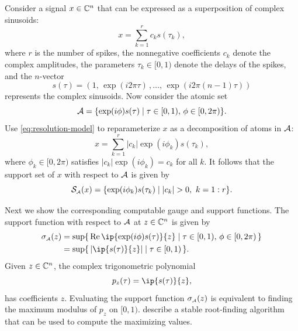 \begin{example}
  Consider a signal $x \in \mathbb{C}^n$ that can be expressed as a superposition
  of complex sinusoids:
  \begin{equation} \label{eq:resolution-model}
    x = \sum_{k = 1}^r c_ks(\tau_k),
  \end{equation}
  where $r$ is the number of spikes, the nonnegative coefficients $c_k$ denote
  the complex amplitudes, the parameters $\tau_k \in [0, 1)$ denote the delays
  of the spikes, and the $n$-vector
  \[
    s(\tau) = (1,\, \exp(i2\pi\tau)\,, \dots,\, \exp(i2\pi(n-1)\tau))
  \]
  represents the complex sinusoids. Now consider the atomic set
  \[
    \mathcal{A} = \{\exp(i\phi)s(\tau) \mid \tau\in[0,1),\, \phi\in[0, 2\pi)\}.
  \]
  Use \eqref{eq:resolution-model} to reparameterize $x$ as a decomposition of
  atoms in $\mathcal{A}$:
  \[
    x = \sum_{k = 1}^r |c_k|\exp(i\phi_k)s(\tau_k),
  \]
  where $\phi_k \in[0, 2\pi)$ satisfies $|c_k|\exp(i\phi_k) = c_k$ for all $k$.
  It follows that the support set of $x$ with respect to $\mathcal{A}$ is given by
  \[
    \mathcal{S}_{\scriptscriptstyle\mathcal{A}}(x) = \{\exp(i\phi_k)s(\tau_k) \mid |c_k| > 0,\ k=1:r\}.
  \]

  Next we show the corresponding computable gauge and support functions. The
  support function with respect to $\mathcal{A}$ at $z \in \mathbb{C}^n$ is given by
  \begin{align*}
    \sigma\As(z)
      &= \sup\{\,\re\ip{\exp(i\phi)s(\tau)}{z}
          \mid \tau\in[0,1),\, \phi\in[0, 2\pi)\,\}
    \\&= \sup\{\,|\ip{s(\tau)}{z}| \mid \tau\in[0,1)\,\}.
  \end{align*}
  Given $z \in \mathbb{C}^n$, the complex trigonometric polynomial
  \[
    p_z(\tau) = \ip{s(\tau)}{z},
  \]
  has coefficients $z$. Evaluating the support function $\sigma_{\scriptscriptstyle\mathcal{A}}(z)$ is
  equivalent to finding the maximum modulus of $p_z$ on $[0, 1)$.
  \citet{mclean2002spectral} describe a stable root-finding algorithm that can
  be used to compute the maximizing values.


\end{example}
